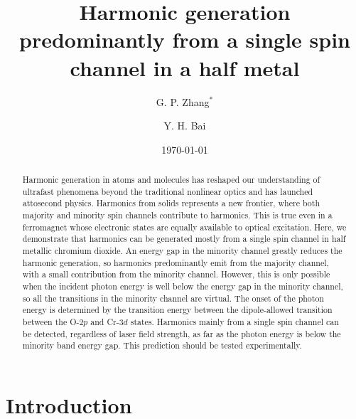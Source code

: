 \documentclass[checkin,showpacs,psfig,aps,pra]{revtex4}
\begin{document}
\title{Harmonic generation {predominantly} from a single spin channel
  in a half metal}


\author{G. P. Zhang$^*$} 

\author{Y. H. Bai}




\date{\today}




\begin{abstract}
{Harmonic generation in atoms and molecules has reshaped our
  understanding of ultrafast phenomena beyond the traditional
  nonlinear optics and has launched attosecond physics. Harmonics from
  solids represents a new frontier, where both majority and minority
  spin channels contribute to harmonics.}  This is true even in a
ferromagnet whose electronic states are equally available to optical
excitation.  Here, we demonstrate that harmonics can be generated
{mostly} from a single spin channel in half metallic chromium
dioxide. {An energy gap in the minority channel greatly reduces
  the harmonic generation}, so harmonics predominantly emit from the
majority channel, with a small contribution from the minority
channel. However, this is only possible when the incident photon
energy is well below the energy gap in the minority channel, so all
the transitions in the minority channel are virtual. The onset of the
photon energy is determined by the transition energy between the
dipole-allowed transition between the O-$2p$ and Cr-$3d$
states. Harmonics {mainly} from a single spin channel can be
detected, regardless of laser field strength, as far as the photon
energy is below the minority band energy gap. This prediction should
be tested experimentally.
\end{abstract}





\maketitle

\section{Introduction}
\end{document}
